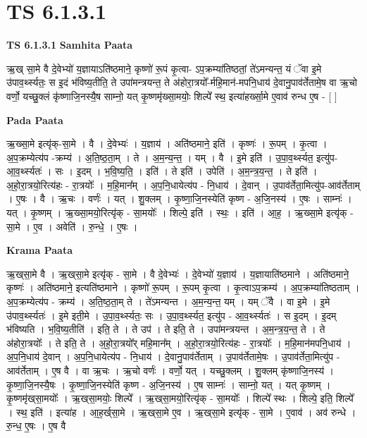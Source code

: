 \documentclass[17pt]{extarticle}
\begin{document}
\section{ TS 6.1.3.1 }

\textbf{TS 6.1.3.1 } \newline
\textbf{Samhita Paata} \newline

ऋ॒ख् सा॒मे वै दे॒वेभ्यो॑ य॒ज्ञायाऽति॑ष्ठमाने॒ कृष्णो॑ रू॒पं कृ॒त्वा- ऽप॒क्रम्या॑तिष्ठतां॒ ते॑ऽमन्यन्त॒ यं ॅवा इ॒मे उ॑पाव॒र्थ्स्यतः॒ स इ॒दं भ॑विष्य॒तीति॒ ते उपा॑मन्त्रयन्त॒ ते अ॑होरा॒त्रयो᳚-र्महि॒मान॑-मपनि॒धाय॑ दे॒वानु॒पाव॑र्तेतामे॒ष वा ऋ॒चो वर्णो॒ यच्छु॒क्लं कृ॑ष्णाजि॒नस्यै॒ष साम्नो॒ यत् कृ॒ष्णमृ॑ख्सा॒मयोः॒ शिल्पे᳚ स्थ॒ इत्या॑हर्ख्सा॒मे ए॒वाव॑ रुन्ध ए॒ष - [  ] \newline

\textbf{Pada Paata} \newline

ऋ॒ख्सा॒मे इत्यृ॑क्-सा॒मे । वै । दे॒वेभ्यः॑ । य॒ज्ञाय॑ । अति॑ष्ठमाने॒ इति॑ । कृष्णः॑ । रू॒पम् । कृ॒त्वा । अ॒प॒क्रम्येत्य॑प -क्रम्य॑ । अ॒ति॒ष्ठ॒ता॒म् । ते । अ॒म॒न्य॒न्त॒ । यम् । वै । इ॒मे इति॑ । उ॒पा॒व॒र्थ्स्यत॒ इत्यु॑प-आ॒व॒र्थ्स्यतः॑ । सः । इ॒दम् । भ॒वि॒ष्य॒ति॒ । इति॑ । ते इति॑ । उपेति॑ । अ॒म॒न्त्र॒य॒न्त॒ । ते इति॑ । अ॒हो॒रा॒त्रयो॒रित्य॑हः - रा॒त्रयोः᳚ । म॒हि॒मान᳚म् । अ॒प॒नि॒धायेत्य॑प - नि॒धाय॑ । दे॒वान् । उ॒पाव॑र्तेता॒मित्यु॑प-आव॑र्तेताम् । ए॒षः । वै । ऋ॒चः । वर्णः॑ । यत् । शु॒क्लम् । कृ॒ष्णा॒जि॒नस्येति॑ कृष्ण - अ॒जि॒नस्य॑ । ए॒षः । साम्नः॑ । यत् । कृ॒ष्णम् । ऋ॒ख्सा॒मयो॒रित्यृ॑क् - सा॒मयोः᳚ । शिल्पे॒ इति॑ । स्थः॒ । इति॑ । आ॒ह॒ । ऋ॒ख्सा॒मे इत्यृ॑क् - सा॒मे । ए॒व । अवेति॑ । रु॒न्धे॒ । ए॒षः ।  \newline


\textbf{Krama Paata} \newline

ऋ॒ख्‌सा॒मे वै । ऋ॒ख्‌सा॒मे इत्यृ॑क् - सा॒मे । वै दे॒वेभ्यः॑ । दे॒वेभ्यो॑ य॒ज्ञाय॑ । य॒ज्ञायाति॑ष्ठमाने । अति॑ष्ठमाने॒ कृष्णः॑ । अति॑ष्ठमाने॒ इत्यति॑ष्ठमाने । कृष्णो॑ रू॒पम् । रू॒पम् कृ॒त्वा । कृ॒त्वाऽप॒क्रम्य॑ । अ॒प॒क्रम्या॑तिष्ठताम् । अ॒प॒क्रम्येत्य॑प - क्रम्य॑ । अ॒ति॒ष्ठ॒ता॒म् ते । ते॑ऽमन्यन्त । अ॒म॒न्य॒न्त॒ यम् । यम् ॅवै । वा इ॒मे । इ॒मे उ॑पाव॒र्थ्स्यतः॑ । इ॒मे इती॒मे । उ॒पा॒व॒र्थ्स्यतः॒ सः । उ॒पा॒व॒र्थ्स्यत॒ इत्यु॑प - आ॒व॒र्थ्स्यतः॑ । स इ॒दम् । इ॒दम् भ॑विष्यति । भ॒वि॒ष्य॒तीति॑ । इति॒ ते । ते उप॑ । ते इति॒ ते । उपा॑मन्त्रयन्त । अ॒म॒न्त्र॒य॒न्त॒ ते । ते अ॑होरा॒त्रयोः᳚ । ते इति॒ ते । अ॒हो॒रा॒त्रयो᳚र् महि॒मान᳚म् । अ॒हो॒रा॒त्रयो॒रित्य॑हः - रा॒त्रयोः᳚ । म॒हि॒मान॑मपनि॒धाय॑ । अ॒प॒नि॒धाय॑ दे॒वान् । अ॒प॒नि॒धायेत्य॑प - नि॒धाय॑ । दे॒वानु॒पाव॑र्तेताम् । उ॒पाव॑र्तेतामे॒षः । उ॒पाव॑र्तेता॒मित्यु॑प - आव॑र्तेताम् । ए॒ष वै । वा ऋ॒चः । ऋ॒चो वर्णः॑ । वर्णो॒ यत् । यच्छु॒क्लम् । शु॒क्लम् कृ॑ष्णाजि॒नस्य॑ । कृ॒ष्णा॒जि॒नस्यै॒षः । कृ॒ष्णा॒जि॒नस्येति॑ कृष्ण - अ॒जि॒नस्य॑ । ए॒ष साम्नः॑ । साम्नो॒ यत् । यत् कृ॒ष्णम् । कृ॒ष्णमृ॑ख्‌सा॒मयोः᳚ । ऋ॒ख्‌सा॒मयोः॒ शिल्पे᳚ । ऋ॒ख्‌सा॒मयो॒रित्यृ॑क् - सा॒मयोः᳚ । शिल्पे᳚ स्थः । शिल्पे॒ इति॒ शिल्पे᳚ । स्थ॒ इति॑ । इत्या॑ह । आ॒ह॒र्ख्‌सा॒मे । ऋ॒ख्‌सा॒मे ए॒व । ऋ॒ख्‌सा॒मे इत्यृ॑क् - सा॒मे । ए॒वाव॑ । अव॑ रुन्धे । रु॒न्ध॒ ए॒षः । ए॒ष वै \newline
\end{document}
